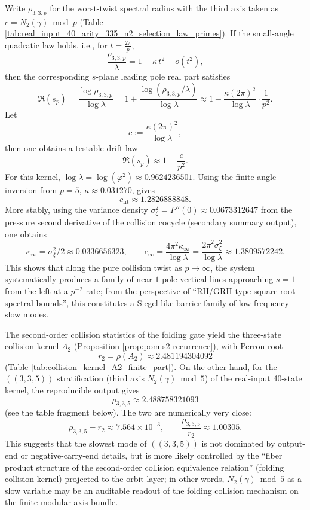 \begin{remark}\label{rem:arity-335-near1-pole-drift}
Write \(\rho_{3,3,p}\) for the worst-twist spectral radius with the third axis taken as \(c=N_2(\gamma)\bmod p\) (Table \ref{tab:real_input_40_arity_335_n2_selection_law_primes}). If the small-angle quadratic law holds, i.e., for \(t=\frac{2\pi}{p}\),
\[
\frac{\rho_{3,3,p}}{\lambda}=1-\kappa\,t^2+o(t^2),
\]
then the corresponding \(s\)-plane leading pole real part satisfies
\[
\Re(s_p)
=\frac{\log\rho_{3,3,p}}{\log\lambda}
=1+\frac{\log(\rho_{3,3,p}/\lambda)}{\log\lambda}
\approx 1-\frac{\kappa(2\pi)^2}{\log\lambda}\cdot\frac{1}{p^2}.
\]
Let
\[
c:=\frac{\kappa(2\pi)^2}{\log\lambda},
\]
then one obtains a testable drift law
$$
\Re(s_p)\approx 1-\frac{c}{p^2}.
$$
For this kernel, \(\log\lambda=\log(\varphi^2)\approx 0.9624236501\). Using the finite-angle inversion from \(p=5\), \(\kappa\approx 0.031270\), gives
\[
c_{\mathrm{fit}}\approx 1.2826888848.
\]
More stably, using the variance density \(\sigma_\xi^2=P''(0)\approx 0.0673312647\) from the pressure second derivative of the collision cocycle (secondary summary output), one obtains
\[
\kappa_\infty=\sigma_\xi^2/2\approx 0.0336656323,
\qquad
c_\infty=\frac{4\pi^2\kappa_\infty}{\log\lambda}=\frac{2\pi^2\sigma_\xi^2}{\log\lambda}\approx 1.3809572242.
\]
This shows that along the pure collision twist as \(p\to\infty\), the system systematically produces a family of near-\(1\) pole vertical lines approaching \(s=1\) from the left at a \(p^{-2}\) rate; from the perspective of ``RH/GRH-type square-root spectral bounds'', this constitutes a Siegel-like barrier family of low-frequency slow modes.
\end{remark}

\begin{remark}\label{rem:arity-335-rho-close-to-a2}\label{rem:arity-335-r2-vs-rho}
The second-order collision statistics of the folding gate yield the three-state collision kernel \(A_2\) (Proposition \ref{prop:pom-s2-recurrence}), with Perron root
$$
r_2=\rho(A_2)\approx 2.481194304092
$$
(Table \ref{tab:collision_kernel_A2_finite_part}).
On the other hand, for the \(((3,3,5))\) stratification (third axis \(N_2(\gamma)\bmod 5\)) of the real-input 40-state kernel, the reproducible output gives
$$
\rho_{3,3,5}\approx 2.488758321093
$$
(see the table fragment below).
The two are numerically very close:
$$
\rho_{3,3,5}-r_2\approx 7.564\times 10^{-3},
\qquad
\frac{\rho_{3,3,5}}{r_2}\approx 1.00305.
$$
This suggests that the slowest mode of \(((3,3,5))\) is not dominated by output-end or negative-carry-end details, but is more likely controlled by the ``fiber product structure of the second-order collision equivalence relation'' (folding collision kernel) projected to the orbit layer; in other words, \(N_2(\gamma)\bmod 5\) as a slow variable may be an auditable readout of the folding collision mechanism on the finite modular axis bundle.
\end{remark}

